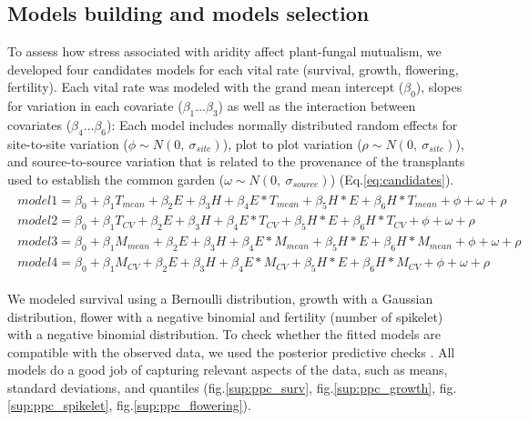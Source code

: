 \documentclass[11pt]{article}
\begin{document}
\subsection*{Models building and models selection}
To assess how stress associated with aridity  affect plant-fungal mutualism, we developed four candidates models for each vital rate (survival, growth, flowering, fertility). 
Each vital rate was modeled with  the  grand mean intercept ($\beta_{0}$), slopes for  variation in each covariate ($\beta_{1}$...$\beta_{3}$) as well as the interaction between covariates ($\beta_{4}$...$\beta_{6}$): 
Each model includes normally distributed random effects for site-to-site  variation ($\phi \sim N(0,\ \sigma_{site})$), plot to plot variation ($\rho \sim N(0,\ \sigma_{site})$), and source-to-source variation that is related to the  provenance of the transplants used to establish the common garden ($\omega \sim N(0,\ \sigma_{source})$) (Eq.\ref{eq:candidates}).
\begin{align}\label{eq:candidates}
\begin{split}
model1 = \beta_{0} + \beta_{1}T_{mean}  + \beta_{2}E + \beta_{3}H + \beta_{4}E*T_{mean} + \beta_{5}H*E +  \beta_{6}H*T_{mean} + \phi + \omega + \rho  \\ 
model2  = \beta_{0} + \beta_{1}T_{CV}  + \beta_{2}E + \beta_{3}H + \beta_{4}E*T_{CV} + \beta_{5}H*E +  \beta_{6}H*T_{CV} +  \phi + \omega + \rho  \\
model3  = \beta_{0} + \beta_{1}M_{mean}  + \beta_{2}E + \beta_{3}H + \beta_{4}E*M_{mean} + \beta_{5}H*E +  \beta_{6}H*M_{mean} + \phi + \omega + \rho \\
model4  = \beta_{0} + \beta_{1}M_{CV}  + \beta_{2}E + \beta_{3}H + \beta_{4}E*M_{CV} + \beta_{5}H*E +  \beta_{6}H*M_{CV} + \phi + \omega + \rho 
\end{split}
\end{align}
 
We modeled survival using a  Bernoulli distribution, growth with a Gaussian distribution, flower with a negative binomial and fertility (number of spikelet) with a negative binomial distribution.
To check whether the fitted models are  compatible with the observed data, we used the posterior predictive checks \citep{gelman2000diagnostic,berkhof2000posterior}. 
All models  do a good job of capturing relevant aspects of the data, such as means, standard deviations, and quantiles (fig.\ref{sup:ppc_surv}, fig.\ref{sup:ppc_growth}, fig.\ref{sup:ppc_spikelet}, fig.\ref{sup:ppc_flowering}).
\end{document}
